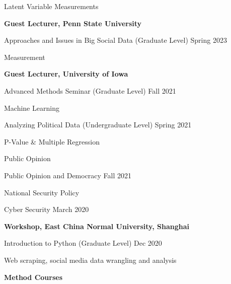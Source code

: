 \documentclass[10.5pt,]{article}
\providecommand{\tightlist}{%
	\setlength{\itemsep}{0pt}\setlength{\parskip}{0pt}}
\renewenvironment{itemize}{
	\begin{list}{}{
			\setlength{\leftmargin}{1.5em}
		}
	}{
	\end{list}
}
\begin{document}
\begin{itemize}
\begin{itemize}
    \begin{itemize}
    \tightlist
    \item
      Latent Variable Measurements
    \end{itemize}
  \item
    \textbf{Guest Lecturer, Penn State University}
  \item
    Approaches and Issues in Big Social Data (Graduate Level)
    \hfill Spring 2023

    \begin{itemize}
    \tightlist
    \item
      Measurement
    \end{itemize}
  \item
    \textbf{Guest Lecturer, University of Iowa}
  \item
    Advanced Methods Seminar (Graduate Level) \hfill Fall 2021

    \begin{itemize}
    \tightlist
    \item
      Machine Learning
    \end{itemize}
  \item
    Analyzing Political Data (Undergraduate Level) \hfill Spring 2021

    \begin{itemize}
    \tightlist
    \item
      P-Value \& Multiple Regression
    \end{itemize}
  \item
    Public Opinion

    \begin{itemize}
    \tightlist
    \item
      Public Opinion and Democracy \hfill Fall 2021
    \end{itemize}
  \item
    National Security Policy

    \begin{itemize}
    \tightlist
    \item
      Cyber Security \hfill March 2020
    \end{itemize}
  \item
    \textbf{Workshop, East China Normal University, Shanghai}
  \item
    Introduction to Python (Graduate Level) \hfill Dec 2020

    \begin{itemize}
    \tightlist
    \item
      Web scraping, social media data wrangling and analysis
    \end{itemize}
  \end{itemize}
\item
  \textbf{Method Courses}


\end{itemize}
\end{document}
